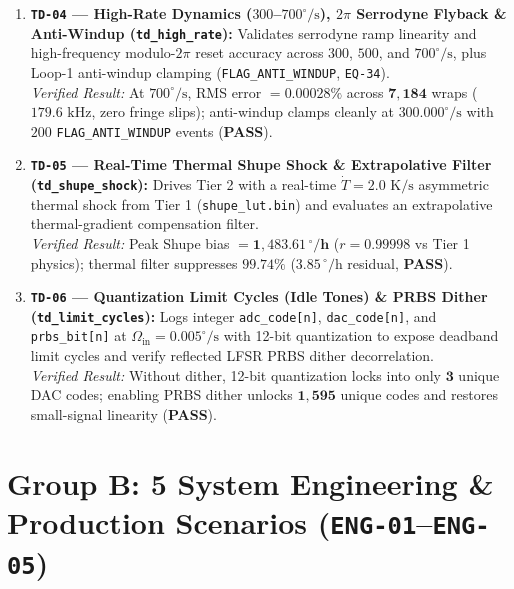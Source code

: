 \documentclass[11pt,a4paper]{article}
\begin{document}
\begin{enumerate}
    \item \textbf{\texttt{TD-04} --- High-Rate Dynamics ($300$--$700^\circ/\text{s}$), $2\pi$ Serrodyne Flyback \& Anti-Windup (\texttt{td\_high\_rate}):}
    Validates serrodyne ramp linearity and high-frequency modulo-$2\pi$ reset accuracy across $300$, $500$, and $700^\circ/\text{s}$, plus Loop-1 anti-windup clamping (\texttt{FLAG\_ANTI\_WINDUP}, \texttt{EQ-34}).\\
    \emph{Verified Result:} At $700^\circ/\text{s}$, RMS error $= \mathbf{0.00028\%}$ across $\mathbf{7{,}184}$ wraps ($179.6\text{ kHz}$, zero fringe slips); anti-windup clamps cleanly at $300.000^\circ/\text{s}$ with $200$ \texttt{FLAG\_ANTI\_WINDUP} events (\textbf{PASS}).

    \item \textbf{\texttt{TD-05} --- Real-Time Thermal Shupe Shock \& Extrapolative Filter (\texttt{td\_shupe\_shock}):}
    Drives Tier 2 with a real-time $\dot{T} = 2.0\text{ K/s}$ asymmetric thermal shock from Tier 1 (\texttt{shupe\_lut.bin}) and evaluates an extrapolative thermal-gradient compensation filter.\\
    \emph{Verified Result:} Peak Shupe bias $= \mathbf{1{,}483.61\,^\circ/\text{h}}$ ($r = 0.99998$ vs Tier 1 physics); thermal filter suppresses $\mathbf{99.74\%}$ ($3.85\,^\circ/\text{h}$ residual, \textbf{PASS}).

    \item \textbf{\texttt{TD-06} --- Quantization Limit Cycles (Idle Tones) \& PRBS Dither (\texttt{td\_limit\_cycles}):}
    Logs integer \texttt{adc\_code[n]}, \texttt{dac\_code[n]}, and \texttt{prbs\_bit[n]} at $\Omega_{\text{in}} = 0.005^\circ/\text{s}$ with 12-bit quantization to expose deadband limit cycles and verify reflected LFSR PRBS dither decorrelation.\\
    \emph{Verified Result:} Without dither, 12-bit quantization locks into only $\mathbf{3}$ unique DAC codes; enabling PRBS dither unlocks $\mathbf{1{,}595}$ unique codes and restores small-signal linearity (\textbf{PASS}).
\end{enumerate}

\section{Group B: 5 System Engineering \& Production Scenarios (\texttt{ENG-01}--\texttt{ENG-05})}
\end{document}
